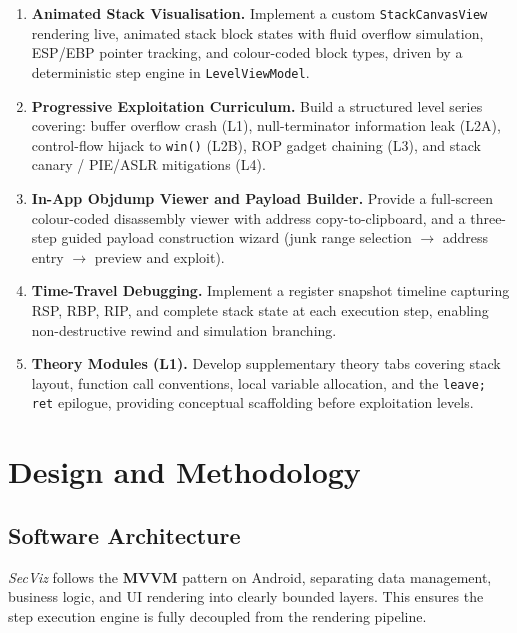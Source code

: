 \documentclass[12pt,a4paper]{article}
\newcommand{\SV}{\textit{SecViz}}
\begin{document}
\begin{enumerate}[leftmargin=1.5em, itemsep=5pt]
    \item \textbf{Animated Stack Visualisation.} Implement a custom
    \texttt{StackCanvasView} rendering live, animated stack block states with
    fluid overflow simulation, ESP/EBP pointer tracking, and colour-coded block
    types, driven by a deterministic step engine in \texttt{LevelViewModel}.

    \item \textbf{Progressive Exploitation Curriculum.} Build a structured level
    series covering: buffer overflow crash (L1), null-terminator information leak
    (L2A), control-flow hijack to \texttt{win()} (L2B), ROP gadget chaining (L3),
    and stack canary / PIE/ASLR mitigations (L4).

    \item \textbf{In-App Objdump Viewer and Payload Builder.} Provide a
    full-screen colour-coded disassembly viewer with address copy-to-clipboard,
    and a three-step guided payload construction wizard (junk range selection
    $\to$ address entry $\to$ preview and exploit).

    \item \textbf{Time-Travel Debugging.} Implement a register snapshot timeline
    capturing RSP, RBP, RIP, and complete stack state at each execution step,
    enabling non-destructive rewind and simulation branching.

    \item \textbf{Theory Modules (L1).} Develop supplementary theory tabs covering
    stack layout, function call conventions, local variable allocation, and the
    \texttt{leave; ret} epilogue, providing conceptual scaffolding before exploitation
    levels.
\end{enumerate}

\section{Design and Methodology}

\subsection{Software Architecture}

\SV{} follows the \textbf{MVVM} pattern on Android, separating data management,
business logic, and UI rendering into clearly bounded layers. This ensures the step
execution engine is fully decoupled from the rendering pipeline.
\end{document}
